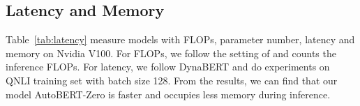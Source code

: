 \documentclass[letterpaper]{article} \usepackage{aaai22}  \usepackage{times}  \usepackage{helvet}  \usepackage{courier}  \usepackage[hyphens]{url}  \usepackage{graphicx} \urlstyle{rm} \def\UrlFont{\rm}  \usepackage{natbib}  \usepackage{caption} \DeclareCaptionStyle{ruled}{labelfont=normalfont,labelsep=colon,strut=off} \frenchspacing  \setlength{\pdfpagewidth}{8.5in}  \setlength{\pdfpageheight}{11in}  \usepackage{algorithm}
\begin{document}
\subsection{Latency and Memory}
Table~\ref{tab:latency}  measure models with FLOPs, parameter number, latency and memory on Nvidia V100. For FLOPs, we follow the setting of \cite{clark2019electra,jiang2020convbert} and counts the inference FLOPs.  For latency,  we follow DynaBERT\cite{DBLP:conf/NeurIPS/HouHSJCL20} and do experiments on QNLI training set with batch size 128. From the results, we can find that our model AutoBERT-Zero is faster and occupies less memory during inference. 



\end{document}
